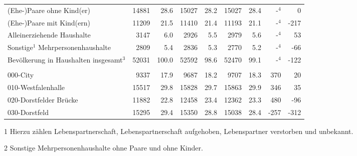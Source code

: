 \documentclass[
  a4paper,
  twoside]{article}
\begin{document}
\begin{table}[!h]
{\begin{threeparttable}
\begin{tabular}[t]{lrrrrrrrr}
\hspace{1em}\hspace{1em}(Ehe-)Paare ohne Kind(er) & 14881 & 28.6 & 15027 & 28.2 & 15027 & 28.4 & -$^{4}$ & 0\\
\hspace{1em}\hspace{1em}(Ehe-)Paare mit Kind(ern) & 11209 & 21.5 & 11410 & 21.4 & 11193 & 21.1 & -$^{4}$ & -217\\
\hspace{1em}\hspace{1em}Alleinerziehende Haushalte & 3147 & 6.0 & 2926 & 5.5 & 2979 & 5.6 & -$^{4}$ & 53\\
\hspace{1em}\hspace{1em}Sonstige$^{1}$ Mehrpersonenhaushalte & 2809 & 5.4 & 2836 & 5.3 & 2770 & 5.2 & -$^{4}$ & -66\\
\hspace{1em}\hspace{1em}Bevölkerung in Haushalten insgesamt$^{3}$ & 52031 & 100.0 & 52592 & 98.6 & 52470 & 99.1 & -$^{4}$ & -122\\
\addlinespace[0.3em]
\multicolumn{9}{l}{\textcolor[HTML]{044891}{Bevölkerung nach Statistischen Bezirken}}\\
\hspace{1em}\hspace{1em}000-City & 9337 & 17.9 & 9687 & 18.2 & 9707 & 18.3 & 370 & 20\\
\hspace{1em}\hspace{1em}010-Westfalenhalle & 15517 & 29.8 & 15828 & 29.7 & 15863 & 29.9 & 346 & 35\\
\hspace{1em}\hspace{1em}020-Dorstfelder Brücke & 11882 & 22.8 & 12458 & 23.4 & 12362 & 23.3 & 480 & -96\\
\hspace{1em}\hspace{1em}030-Dorstfeld & 15295 & 29.4 & 15350 & 28.8 & 15038 & 28.4 & -257 & -312\\
\bottomrule
\end{tabular}
\begin{tablenotes}
\small
\item[1] Hierzu zählen Lebenspartnerschaft, Lebenspartnerschaft aufgehoben, Lebenspartner verstorben und unbekannt.
\item[2] Sonstige Mehrpersonenhaushalte ohne Paare und ohne Kinder.

\end{tablenotes}
\end{threeparttable}}
\end{table}
\end{document}
